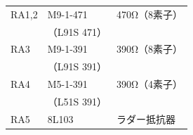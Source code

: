 \documentclass[handout]{beamer}        %
\begin{document}
\begin{frame}
\begin{minipage}{0.54\columnwidth}
\begin{center}
{\begin{tabular}{l|l|l}
        \hline
        RA1,2 & M9-1-471   & 470Ω（8素子） \\
        &（L91S 471）&               \\
        RA3   & M9-1-391   & 390Ω（8素子） \\
        &（L91S 391）&               \\
        RA4   & M5-1-391   & 390Ω（4素子） \\
        &（L51S 391）&               \\
        RA5   & 8L103      & ラダー抵抗器  \\
      \end{tabular}}
    \end{center}
  \end{minipage}
\end{frame}

\end{document}
